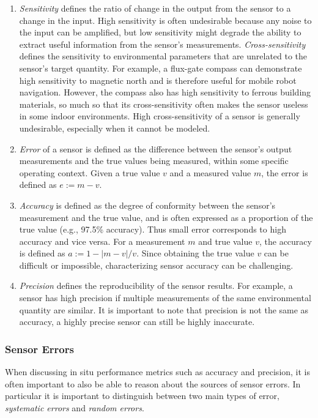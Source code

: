 \begin{enumerate}
    \item \textit{Sensitivity} defines the ratio of change in the output from the sensor to a change in the input. High sensitivity is often undesirable because any noise to the input can be amplified, but low sensitivity might degrade the ability to extract useful information from the sensor's measurements.
    \textit{Cross-sensitivity} defines the sensitivity to environmental parameters that are unrelated to the sensor's target quantity. For example, a flux-gate compass can demonstrate high sensitivity to magnetic north and is therefore useful for mobile robot navigation. However, the compass also has high sensitivity to ferrous building materials, so much so that its cross-sensitivity often makes the sensor useless in some indoor environments. High cross-sensitivity of a sensor is generally undesirable, especially when it cannot be modeled.
    \item \textit{Error} of a sensor is defined as the difference between the sensor’s output measurements and the true values being measured, within some specific operating context. Given a true value $v$ and a measured value $m$, the error is defined as $e:=m-v$.
    \item \textit{Accuracy} is defined as the degree of conformity between the sensor’s measurement and the true value, and is often expressed as a proportion of the true value (e.g., 97.5\% accuracy). Thus small error corresponds to high accuracy and vice versa. For a measurement $m$ and true value $v$, the accuracy is defined as $a:=1-|m-v|/v$. 
    Since obtaining the true value $v$ can be difficult or impossible, characterizing sensor accuracy can be challenging.
    \item \textit{Precision} defines the reproducibility of the sensor results. For example, a sensor has high precision if multiple measurements of the same environmental quantity are similar. It is important to note that precision is not the same as accuracy, a highly precise sensor can still be highly inaccurate.
\end{enumerate}

\subsubsection{Sensor Errors}
When discussing in situ performance metrics such as accuracy and precision, it is often important to also be able to reason about the sources of sensor errors. In particular it is important to distinguish between two main types of error, \textit{systematic errors} and \textit{random errors}.

